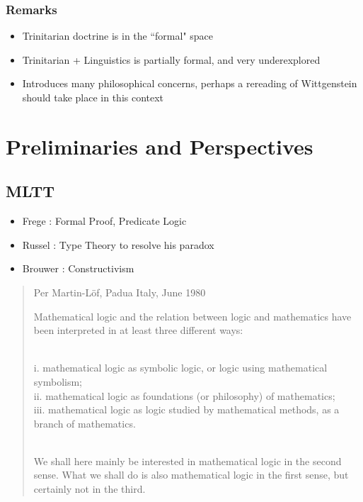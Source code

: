 \documentclass[10pt]{beamer}
\begin{document}
\begin{frame}[fragile]
\frametitle{Remarks}
\centering 
\begin{itemize}
\item Trinitarian doctrine is in the ``formal" space
\item Trinitarian + Linguistics is partially formal, and very underexplored
\item Introduces many philosophical concerns, perhaps a rereading of
  Wittgenstein should take place in this context
\end{itemize}
\end{frame}

\section{Preliminaries and Perspectives}

\subsection{MLTT}

\begin{frame}

\begin{itemize}
  \item Frege : Formal Proof, Predicate Logic
  \item Russel : Type Theory to resolve his paradox
  \item Brouwer : Constructivism
\end{itemize}

\end{frame}

\begin{frame}

\begin{quote}{Per Martin-Löf, Padua Italy, June 1980}

Mathematical logic and the relation between logic and mathematics have been
interpreted in at least three different ways:
\newline

\\
i. mathematical logic as symbolic logic, or logic using mathematical symbolism; \\
ii. mathematical logic as foundations (or philosophy) of mathematics;\\
iii. mathematical logic as logic studied by mathematical methods, as a branch of mathematics.
\newline

\\
We shall here mainly be interested in mathematical logic in the second sense.
What we shall do is also mathematical logic in the first sense, but certainly
not in the third.
\end{quote}
\end{frame}
\end{document}
